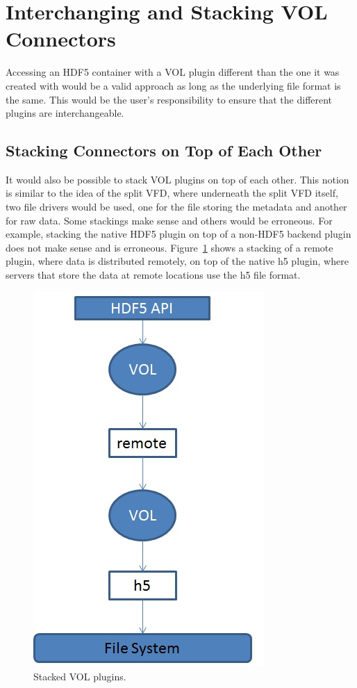 \section{Interchanging and Stacking VOL Connectors}
\label{sec:stack}

Accessing an HDF5 container with a VOL plugin different than the one
it was created with would be a valid approach as long as the
underlying file format is the same. This would be the user’s
responsibility to ensure that the different plugins are
interchangeable.

\subsection{Stacking Connectors on Top of Each Other}
It would also be possible to stack VOL plugins on top of each
other. This notion is similar to the idea of the split VFD, where
underneath the split VFD itself, two file drivers would be used, one
for the file storing the metadata and another for raw data. Some
stackings make sense and others would be erroneous. For example,
stacking the native HDF5 plugin on top of a non-HDF5 backend plugin
does not make sense and is erroneous. Figure~\ref{fig:stack} shows a
stacking of a remote plugin, where data is distributed remotely, on
top of the native h5 plugin, where servers that store the data at
remote locations use the h5 file format.

\begin{figure}[ht!]
\centering
\includegraphics[scale=0.75]{stacked.jpg}
\caption{Stacked VOL plugins.}
\label{fig:stack}
\end{figure}


